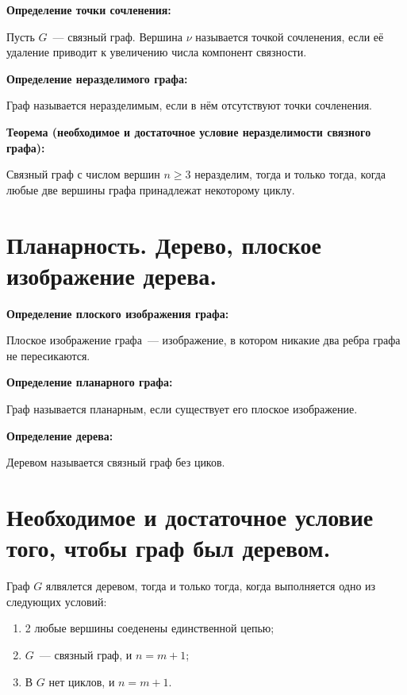 \textbf{Определение точки сочленения:}
    \smallskip

    Пусть $G$~--- связный граф. Вершина $\nu$ называется точкой сочленения,
    если её удаление приводит к увеличению числа компонент связности.
    \bigskip

\textbf{Определение неразделимого графа:}
    \smallskip
    
    Граф называется неразделимым, если в нём отсутствуют точки сочленения.
    \bigskip

\textbf{Теорема (необходимое и достаточное условие неразделимости связного
графа):}
    \smallskip
    
    Связный граф с числом вершин $n \geq 3$ неразделим, тогда и только тогда,
    когда любые две вершины графа принадлежат некоторому циклу.

\section{Планарность. Дерево, плоское изображение дерева.}

\textbf{Определение плоского изображения графа:}
    \smallskip

    Плоское изображение графа~--- изображение, в котором никакие два
    ребра графа не пересикаются.
    \bigskip

\textbf{Определение планарного графа:}
    \smallskip
    
    Граф называется планарным, если существует его плоское изображение.
    \bigskip

\textbf{Определение дерева:}
    \smallskip
    
    Деревом называется связный граф без циков.
    \bigskip

\section{Необходимое и достаточное условие того, чтобы граф был деревом.}

Граф $G$ ялвялется деревом, тогда и только тогда, когда выполняется одно из
следующих условий:

\begin{enumerate}
    \item{2 любые вершины соеденены единственной цепью;}
    \item{$G$~--- связный граф, и $n = m + 1$;}
    \item{В $G$ нет циклов, и $n = m + 1$.}
\end{enumerate}
\bigskip


